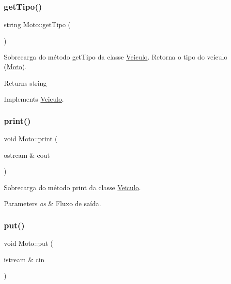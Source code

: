 \subsubsection{\texorpdfstring{get\+Tipo()}{getTipo()}}
{\footnotesize\ttfamily string Moto\+::get\+Tipo (\begin{DoxyParamCaption}{ }\end{DoxyParamCaption})\hspace{0.3cm}{\ttfamily [virtual]}}



Sobrecarga do método get\+Tipo da classe \hyperlink{classVeiculo}{Veiculo}. Retorna o tipo do veículo (\hyperlink{classMoto}{Moto}). 

\begin{DoxyReturn}{Returns}
string 
\end{DoxyReturn}


Implements \hyperlink{classVeiculo}{Veiculo}.

\mbox{\label{classMoto_a5e1247fc0aa0b19054e2a059d4d413ec}} 
\subsubsection{\texorpdfstring{print()}{print()}}
{\footnotesize\ttfamily void Moto\+::print (\begin{DoxyParamCaption}\item[{ostream \&}]{cout }\end{DoxyParamCaption})}



Sobrecarga do método print da classe \hyperlink{classVeiculo}{Veiculo}. 


\begin{DoxyParams}{Parameters}
{\em os} & Fluxo de saída. \\
\hline
\end{DoxyParams}
\mbox{\label{classMoto_a95bb5d4dd623c9c4ad7fa1f219086ca8}} 
\subsubsection{\texorpdfstring{put()}{put()}}
{\footnotesize\ttfamily void Moto\+::put (\begin{DoxyParamCaption}\item[{istream \&}]{cin }\end{DoxyParamCaption})}



